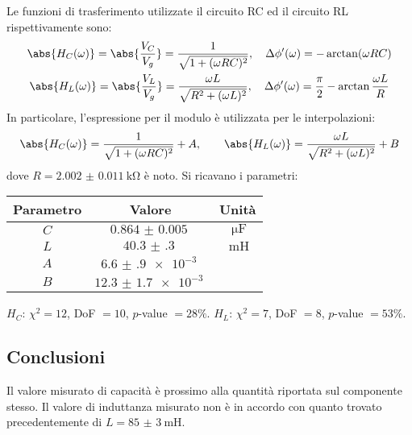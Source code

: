 \documentclass[a4paper]{article}
\begin{document}
Le funzioni di trasferimento utilizzate il circuito RC ed il circuito RL rispettivamente sono:
\begin{gather*}
	\abs{H_C(\omega)}=\abs{\frac{V_C}{V_g}}=\frac{1}{\sqrt{1+(\omega RC)^2} },\quad \Delta \phi'(\omega)=-\arctan(\omega RC)\\
	\abs{H_L(\omega)}=\abs{\frac{V_L}{V_g}}=\frac{\omega L}{\sqrt{R^2+(\omega L)^2} },\quad \Delta \phi'(\omega)=\frac{\pi}{2}-\arctan \frac{\omega L}{R}
\end{gather*}
In particolare, l'espressione per il modulo è utilizzata per le interpolazioni:
\[
	\abs{H_C(\omega)}=\frac{1}{\sqrt{1+(\omega RC)^2} }+A,\qquad \abs{H_L(\omega)}=\frac{\omega L}{\sqrt{R^2+(\omega L)^2} }+B
\] 
dove $R=\SI{2.002(11)}{\kohm}$ è noto. Si ricavano i parametri:
\begin{center}
\begin{tabular}[t]{c|c|c}
	Parametro & Valore & Unità \\\midrule
	$C$ & $\SI{0.864(5)}{}$ & $\SI{}{\micro\F}$\\
	$L$ & $\SI{40.3(3)}{}$ & $\SI{}{\milli\henry}$\\
	$A$ & $\SI{6.6(9)e-3}{}$ & \\
	$B$ & $\SI{12.3(17)e-3}{}$ & \\
\end{tabular}
\end{center}
$H_C$: $\chi^2=12$, DoF $=10$, $p$-value $=28\%$. $H_L$: $\chi^2=7$, DoF $=8$, $p$-value $=53\%$.

\subsection{Conclusioni}
Il valore misurato di capacità è prossimo alla quantità riportata sul componente stesso. Il valore di induttanza misurato non è in accordo con quanto trovato precedentemente di $L=\SI{85(3)}{\milli\henry}$.\\
\end{document}
